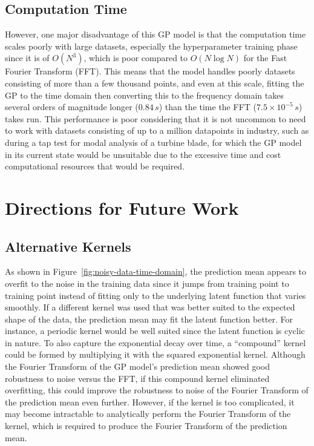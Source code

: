 \documentclass[12pt]{article}
\begin{document}
    \subsection{Computation Time}
    However, one major disadvantage of this GP model is that the computation time scales poorly with large datasets, especially the hyperparameter training phase since it is of $O(N^3)$, which is poor compared to $O(N \log{N})$ for the Fast Fourier Transform (FFT).
    This means that the model handles poorly datasets consisting of more than a few thousand points, and even at this scale, fitting the GP to the time domain then converting this to the frequency domain takes several orders of magnitude longer ($0.84 \, s$) than the time the FFT ($7.5 \times 10^{-5} \, s$) takes run.
    This performance is poor considering that it is not uncommon to need to work with datasets consisting of up to a million datapoints in industry, such as during a tap test for modal analysis of a turbine blade, for which the GP model in its current state would be unsuitable due to the excessive time and cost computational resources that would be required.

    \section{Directions for Future Work}
    \subsection{Alternative Kernels}
    As shown in Figure~\ref{fig:noisy-data-time-domain}, the prediction mean appears to overfit to the noise in the training data since it jumps from training point to training point instead of fitting only to the underlying latent function that varies smoothly.
    If a different kernel was used that was better suited to the expected shape of the data, the prediction mean may fit the latent function better.
    For instance, a periodic kernel would be well suited since the latent function is cyclic in nature.
    To also capture the exponential decay over time, a ``compound'' kernel could be formed by multiplying it with the squared exponential kernel.
    Although the  Fourier Transform of the GP model's prediction mean showed good robustness to noise versus the FFT, if this compound kernel eliminated overfitting, this could improve the robustness to noise of the Fourier Transform of the prediction mean even further.
    However, if the kernel is too complicated, it may become intractable to analytically perform the Fourier Transform of the kernel, which is required to produce the Fourier Transform of the prediction mean.
\end{document}
